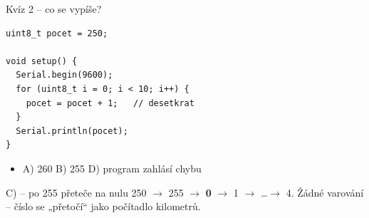\documentclass[12pt,aspectratio=169]{beamer}
\newenvironment{odpovedi}{\footnotesize\begin{itemize}\itemsep1pt}{\end{itemize}}
\newcommand{\spravne}[1]{\alt<1>{#1}{\pozor{#1}}}
\begin{document}
\begin{frame}[fragile]{Kvíz 2 -- co se vypíše?}
\begin{lstlisting}[style=arduino_bez_cisel]
uint8_t pocet = 250;

void setup() {
  Serial.begin(9600);
  for (uint8_t i = 0; i < 10; i++) {
    pocet = pocet + 1;   // desetkrat
  }
  Serial.println(pocet);
}
\end{lstlisting}

  \begin{odpovedi}
    \item[] A) 260 \qquad B) 255 \qquad \spravne{C) 4} \qquad D) program zahlásí chybu
  \end{odpovedi}

  \pause
  \vspace{-2mm}
  \begin{exampleblock}{C) --  po 255 přeteče na nulu}
    \footnotesize 250 $\to$ 255 $\to$ \textbf{0} $\to$ 1 $\to$ \dots $\to$ 4.
    Žádné varování -- číslo se „přetočí`` jako počítadlo kilometrů.
  \end{exampleblock}
\end{frame}
\end{document}
